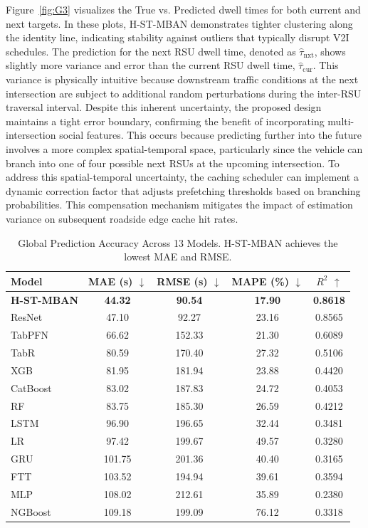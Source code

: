 \documentclass[journal]{IEEEtran}
\begin{document}
Figure~\ref{fig:G3} visualizes the True vs. Predicted dwell times for both current and next targets.
In these plots, H-ST-MBAN demonstrates tighter clustering along the identity line, indicating stability against outliers that typically disrupt V2I schedules.
The prediction for the next RSU dwell time, denoted as $\hat{\tau}_\text{nxt}$, shows slightly more variance and error than the current RSU dwell time, $\hat{\tau}_\text{cur}$. This variance is physically intuitive because downstream traffic conditions at the next intersection are subject to additional random perturbations during the inter-RSU traversal interval. Despite this inherent uncertainty, the proposed design maintains a tight error boundary, confirming the benefit of incorporating multi-intersection social features.
This occurs because predicting further into the future involves a more complex spatial-temporal space, particularly since the vehicle can branch into one of four possible next RSUs at the upcoming intersection.
To address this spatial-temporal uncertainty, the caching scheduler can implement a dynamic correction factor that adjusts prefetching thresholds based on branching probabilities.
This compensation mechanism mitigates the impact of estimation variance on subsequent roadside edge cache hit rates.

\begin{table}[!t]
\centering
\caption{Global Prediction Accuracy Across 13 Models. H-ST-MBAN achieves the lowest MAE and RMSE.}
\label{tab:accuracy}
\begin{tabular}{lcccc}
\toprule
\textbf{Model} & \textbf{MAE (s) $\downarrow$} & \textbf{RMSE (s) $\downarrow$} & \textbf{MAPE (\%) $\downarrow$} & \textbf{$R^2$ $\uparrow$} \\
\midrule
\textbf{H-ST-MBAN} & \textbf{44.32} & \textbf{90.54} & \textbf{17.90} & \textbf{0.8618} \\
ResNet & 47.10 & 92.27 & 23.16 & 0.8565 \\
TabPFN & 66.62 & 152.33 & 21.30 & 0.6089 \\
TabR & 80.59 & 170.40 & 27.32 & 0.5106 \\
XGB & 81.95 & 181.94 & 23.88 & 0.4420 \\
CatBoost & 83.02 & 187.83 & 24.72 & 0.4053 \\
RF & 83.75 & 185.30 & 26.59 & 0.4212 \\
LSTM & 96.90 & 196.65 & 32.44 & 0.3481 \\
LR & 97.42 & 199.67 & 49.57 & 0.3280 \\
GRU & 101.75 & 201.36 & 40.40 & 0.3165 \\
FTT & 103.52 & 194.94 & 39.61 & 0.3594 \\
MLP & 108.02 & 212.61 & 35.89 & 0.2380 \\
NGBoost & 109.18 & 199.09 & 76.12 & 0.3318 \\
\bottomrule
\end{tabular}
\end{table}
\end{document}
